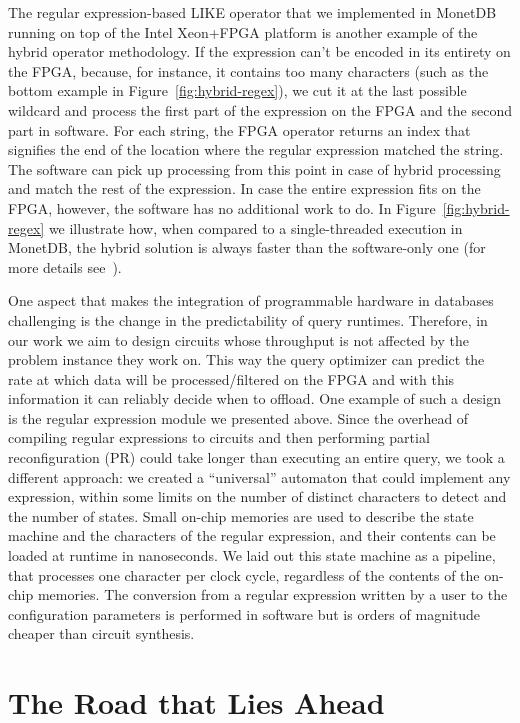 \documentclass[11pt]{article}
\begin{document}
The regular expression-based LIKE operator that we implemented in MonetDB~\cite{sidler-regex-sigmod17} running on top of the Intel Xeon+FPGA platform is another example of the hybrid operator methodology. If the expression can't be encoded in its entirety on the FPGA, because, for instance, it contains too many characters (such as the bottom example in Figure~\ref{fig:hybrid-regex}), we cut it at the last possible wildcard and process the first part of the expression on the FPGA and the second part in software. For each string, the FPGA operator returns an index that signifies the end of the location where the regular expression matched the string. The software can pick up processing from this point in case of hybrid processing and match the rest of the expression. In case the entire expression fits on the FPGA, however, the software has no additional work to do. In Figure~\ref{fig:hybrid-regex} we illustrate how, when compared to a single-threaded execution in MonetDB, the hybrid solution is always faster than the software-only one (for more details see~\cite{sidler-regex-sigmod17}). 

One aspect that makes the integration of programmable hardware in databases challenging is the change in the predictability of query runtimes. Therefore, in our work we aim to design circuits whose throughput is not affected by the problem instance they work on. This way the query optimizer can predict the rate at which data will be processed/filtered on the FPGA and with this information it can reliably decide when to offload. One example of such a design is the regular expression module we presented above. Since the overhead of compiling regular expressions to circuits and then performing partial reconfiguration (PR) could take longer than executing an entire query, we took a different approach: we created a ``universal'' automaton that could implement any expression, within some limits on the number of distinct characters to detect and the number of states. Small on-chip memories are used to describe the state machine and the characters of the regular expression, and their contents can be loaded at runtime in nanoseconds. We laid out this state machine as a pipeline, that processes one character per clock cycle, regardless of the contents of the on-chip memories. The conversion from a regular expression written by a user to the configuration parameters is performed in software but is orders of magnitude cheaper than circuit synthesis.


\section{The Road that Lies Ahead}
\end{document}
